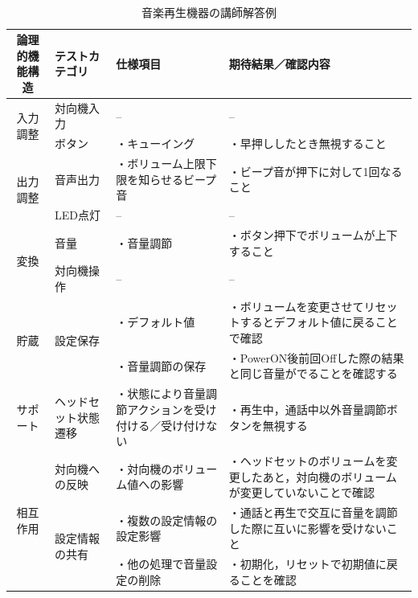 \begin{table}[htbp]
　\footnotesize
  \centering
  \caption{音楽再生機器の講師解答例}
    \begin{tabular}{|c|l|p{11em}|p{11em}|}
    \hline
    \multicolumn{1}{|p{7em}|}{{論理的機能構造}} & \multicolumn{1}{p{8em}|}{{テストカテゴリ}} & {仕様項目} & {期待結果／確認内容} \bigstrut\\
    \hline
    \hline
    \multicolumn{1}{|c|}{\multirow{2}[4]{*}{{入力調整}}} & \multicolumn{1}{p{7.75em}|}{{対向機入力}} & {--} & {--} \bigstrut\\
\cline{2-4}          & \multicolumn{1}{p{7.75em}|}{{ボタン}} & {・キューイング} & {・早押ししたとき無視すること} \bigstrut\\
    \hline
    \multicolumn{1}{|c|}{\multirow{2}[4]{*}{{出力調整}}} & \multicolumn{1}{p{7.75em}|}{{音声出力}} & {・ボリューム上限下限を知らせるビープ音} & {・ビープ音が押下に対して1回なること} \bigstrut\\
\cline{2-4}          & \multicolumn{1}{p{7.75em}|}{{LED点灯}} & {--} & {--} \bigstrut\\
    \hline
    \multicolumn{1}{|c|}{\multirow{2}[4]{*}{{変換}}} & \multicolumn{1}{p{7.75em}|}{{音量}} & {・音量調節} & {・ボタン押下でボリュームが上下すること} \bigstrut\\
\cline{2-4}          & \multicolumn{1}{p{7.75em}|}{{対向機操作}} & {--} & {--} \bigstrut\\
    \hline
    \multicolumn{1}{|c|}{\multirow{2}[2]{*}{{貯蔵}}} & \multicolumn{1}{l|}{\multirow{2}[2]{*}{{設定保存}}} & {・デフォルト値} & {・ボリュームを変更させてリセットするとデフォルト値に戻ることで確認} \bigstrut[t]\\
          &       & {・音量調節の保存} & {・PowerON後前回Offした際の結果と同じ音量がでることを確認する} \bigstrut[b]\\
    \hline
    \multicolumn{1}{|p{5.835em}|}{{サポート}} & \multicolumn{1}{p{7.75em}|}{{ヘッドセット状態遷移}} & {・状態により音量調節アクションを受け付ける／受け付けない} & {・再生中，通話中以外音量調節ボタンを無視する} \bigstrut\\
    \hline
    \multicolumn{1}{|c|}{\multirow{3}[4]{*}{{相互作用}}} & \multicolumn{1}{p{7.75em}|}{{対向機への反映}} & {・対向機のボリューム値への影響} & {・ヘッドセットのボリュームを変更したあと，対向機のボリュームが変更していないことで確認} \bigstrut\\
\cline{2-4}          & \multicolumn{1}{l|}{\multirow{2}[2]{*}{{設定情報の共有}}} & {・複数の設定情報の設定影響} & {・通話と再生で交互に音量を調節した際に互いに影響を受けないこと} \bigstrut[t]\\
          &       & {・他の処理で音量設定の削除} & {・初期化，リセットで初期値に戻ることを確認} \bigstrut[b]\\
    \hline
    \end{tabular}%
  \label{tab:D-3-ensyu1}%
\end{table}%



